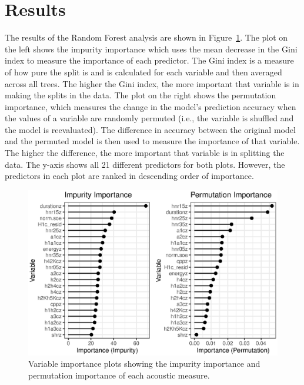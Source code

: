 \section{Results} \label{sec:dt_results}

The results of the Random Forest analysis are shown in Figure~\ref{fig:predictor_importance}. The plot on the left shows the impurity importance which uses the mean decrease in the Gini index to measure the importance of each predictor. The Gini index is a measure of how pure the split is and is calculated for each variable and then averaged across all trees. The higher the Gini index, the more important that variable is in making the splits in the data. The plot on the right shows the permutation importance, which measures the change in the model's prediction accuracy when the values of a variable are randomly permuted (i.e., the variable is shuffled and the model is reevaluated). The difference in accuracy between the original model and the permuted model is then used to measure the importance of that variable. The higher the difference, the more important that variable is in splitting the data. The y-axis shows all 21 different predictors for both plots. However, the predictors in each plot are ranked in descending order of importance. 

\begin{figure}[h!]
    \centering
    \includegraphics[width = \linewidth]{images/RandomForest/rf_dur_plots.eps}
    \caption{Variable importance plots showing the impurity importance and permutation importance of each acoustic measure.}
    \label{fig:predictor_importance}
\end{figure}

